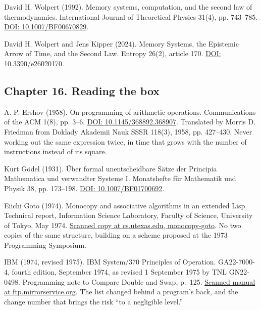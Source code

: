 \documentclass[11pt,twoside]{article}
\theoremstyle{thielethm}
\theoremstyle{thieledef}
\theoremstyle{thieledef}
\theoremstyle{thieledef}
\theoremstyle{thielethm}
\theoremstyle{thieleobs}
\theoremstyle{thielethm}
\begin{document}
\noindent David H. Wolpert (1992). Memory systems, computation, and the second law of thermodynamics. International Journal of Theoretical Physics 31(4), pp. 743--785. \href{https://doi.org/10.1007/BF00670829}{DOI: 10.1007/BF00670829}.
\par\medskip

\noindent David H. Wolpert and Jens Kipper (2024). Memory Systems, the Epistemic Arrow of Time, and the Second Law. Entropy 26(2), article 170. \href{https://doi.org/10.3390/e26020170}{DOI: 10.3390/e26020170}.
\par\medskip

\subsection*{Chapter 16. Reading the box}

\noindent A. P. Ershov (1958). On programming of arithmetic operations. Communications of the ACM 1(8), pp. 3--6. \href{https://doi.org/10.1145/368892.368907}{DOI: 10.1145/368892.368907}. Translated by Morris D. Friedman from Doklady Akademii Nauk SSSR 118(3), 1958, pp. 427--430. Never working out the same expression twice, in time that grows with the number of instructions instead of its square.
\par\medskip

\noindent Kurt G\"odel (1931). \"Uber formal unentscheidbare S\"atze der Principia Mathematica und verwandter Systeme I. Monatshefte f\"ur Mathematik und Physik 38, pp. 173--198. \href{https://doi.org/10.1007/BF01700692}{DOI: 10.1007/BF01700692}.
\par\medskip

\noindent Eiichi Goto (1974). Monocopy and associative algorithms in an extended Lisp. Technical report, Information Science Laboratory, Faculty of Science, University of Tokyo, May 1974. \href{https://www.cs.utexas.edu/~hunt/research/hash-cons/hash-cons-papers/monocopy-goto.pdf}{Scanned copy at cs.utexas.edu, monocopy-goto}. No two copies of the same structure, building on a scheme proposed at the 1973 Programming Symposium.
\par\medskip

\noindent IBM (1974, revised 1975). IBM System/370 Principles of Operation. GA22-7000-4, fourth edition, September 1974, as revised 1 September 1975 by TNL GN22-0498. Programming note to Compare Double and Swap, p.~125. \href{https://ftp.mirrorservice.org/sites/www.bitsavers.org/pdf/ibm/370/princOps/GA22-7000-4_370_Principles_Of_Operation_Sep75.pdf}{Scanned manual at ftp.mirrorservice.org}. The list changed behind a program's back, and the change number that brings the risk ``to a negligible level.''
\par\medskip
\end{document}
